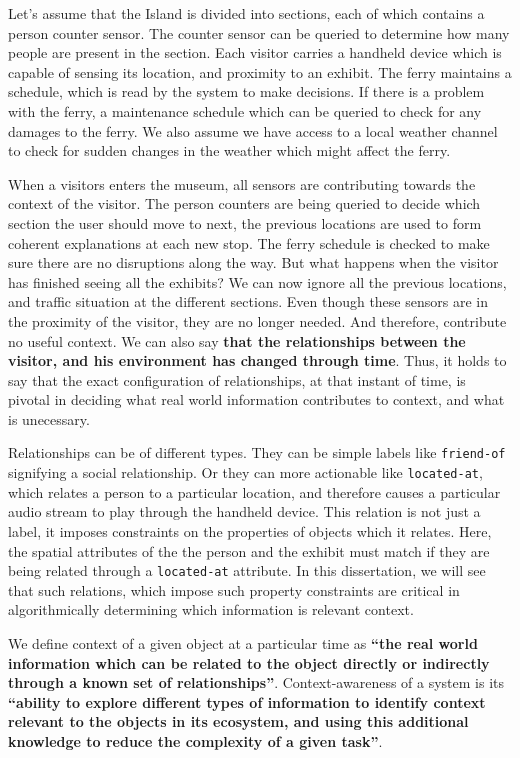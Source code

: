 Let's assume that the Island is divided into sections, each of which contains a person counter sensor. The counter sensor can be queried to determine how many people are present in the section. Each visitor carries a handheld device which is capable of sensing its location, and proximity to an exhibit. The ferry maintains a schedule, which is read by the system to make decisions. If there is a problem with the ferry, a maintenance schedule which can be queried to check for any damages to the ferry. We also assume we have access to a local weather channel to check for sudden changes in the weather which might affect the ferry.

When a visitors enters the museum, all sensors are contributing towards the context of the visitor. The person counters are being queried to decide which section the user should move to next, the previous locations are used to form coherent explanations at each new stop. The ferry schedule is checked to make sure there are no disruptions along the way. But what happens when the visitor has finished seeing all the exhibits? We can now ignore all the previous locations, and traffic situation at the different sections. Even though these sensors are in the proximity of the visitor, they are no longer needed. And therefore, contribute no useful context. We can also say \textbf{that the relationships between the visitor, and his environment has changed through time}. Thus, it holds to say that the exact configuration of relationships, at that instant of time, is pivotal in deciding what real world information contributes to context, and what is unecessary.

Relationships can be of different types. They can be simple labels like \texttt{friend-of} signifying a social relationship. Or they can more actionable like \texttt{located-at}, which relates a person to a particular location, and therefore causes a particular audio stream to play through the handheld device. This relation is not just a label, it imposes constraints on the properties of objects which it relates. Here, the spatial attributes of the the person and the exhibit must match if they are being related through a \texttt{located-at} attribute. In this dissertation, we will see that such relations, which impose such property constraints are critical in algorithmically determining which information is relevant context.

We define context of a given object at a particular time as \textbf{``the real world information which can be related to the object directly or indirectly through a known set of relationships''}. Context-awareness of a system is its \textbf{``ability to explore different types of information to identify context relevant to the objects in its ecosystem, and using this additional knowledge to reduce the complexity of a given task''}.


